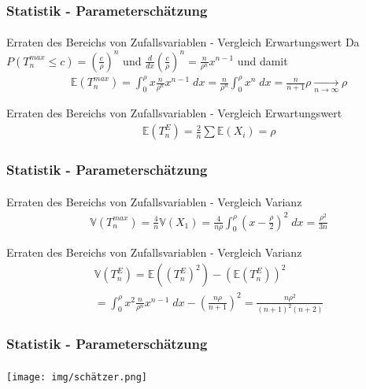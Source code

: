 \documentclass{beamer}
\begin{document}
\begin{frame}
    \frametitle{Statistik - Parameterschätzung}
\framesubtitle{}


\begin{block}{Erraten des Bereichs von Zufallsvariablen - Vergleich Erwartungswert}
Da $P( T_n^{max}  \leq c) = (\frac{c}{\rho})^n $ und  $\frac{d}{dx} (\frac{c}{\rho})^n = \frac{n}{\rho^n} x^{n-1} $ und damit
\begin{align*}
& \mathbb{E}(T_n^{max} ) = \int_{0}^{\rho} x \frac{n}{\rho^n} x^{n- 1} \; dx  = \frac{n}{\rho^n} \int_{0}^{\rho} x^n \; dx = \frac{n}{n+1} \rho    \underset{n \to \infty}{\longrightarrow} \rho
\end{align*}
\end{block}

\begin{block}{Erraten des Bereichs von Zufallsvariablen - Vergleich Erwartungswert}
\begin{align*}
& \mathbb{E}(T_n^{E} ) = \frac{2}{n} \sum \mathbb{E}(X_i)   = \rho
\end{align*}
\end{block}
 \end{frame}




\begin{frame}
    \frametitle{Statistik - Parameterschätzung}
\framesubtitle{}

\begin{block}{Erraten des Bereichs von Zufallsvariablen - Vergleich Varianz}
\begin{align*}
& \mathbb{V}(T_n^{max} ) = \frac{4}{n} \mathbb{V}(X_1)   =  \frac{4}{n \rho}   \int_{0}^{\rho } (x - \frac{\rho}{2})^2 \; dx = \frac{\rho^2}{3n}
\end{align*}
\end{block}
\begin{block}{Erraten des Bereichs von Zufallsvariablen - Vergleich Varianz}
\begin{align*}
& \mathbb{V}(T_n^{E} ) = \mathbb{E}((T_n^{E})^2 ) - (\mathbb{E}(T_n^{E} ))^2   \\
& = \int_{0}^{\rho} x^2 \frac{n}{\rho^n} x^{n- 1} \; dx - (\frac{n \rho}{n+1})^2 = \frac{n \rho^2}{(n+1)^2 (n+2)} 
\end{align*}
\end{block}
 \end{frame}




 \begin{frame}
    \frametitle{Statistik - Parameterschätzung}
\framesubtitle{}
\texttt{[image: img/schätzer.png]}
 \end{frame}
\end{document}
